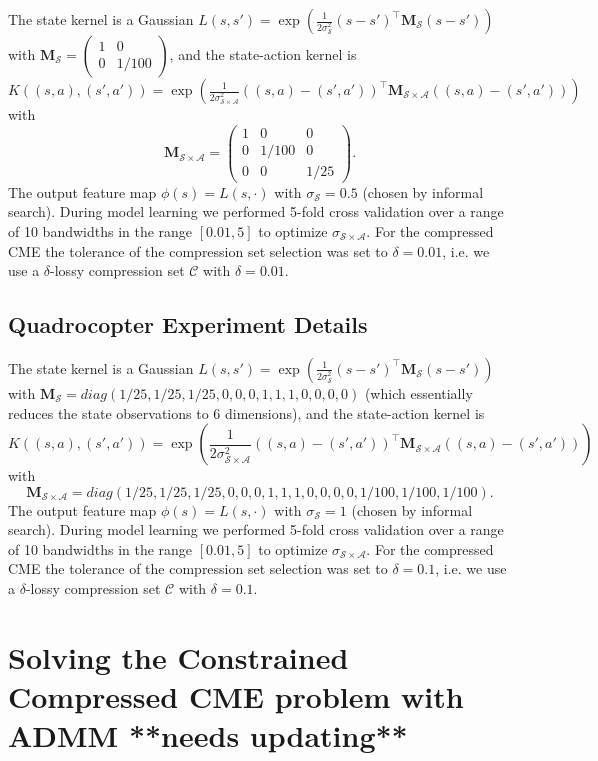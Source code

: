 \documentclass[letterpaper]{article}
\newcommand{\todoc}[2][]{\todo[color=red!20!white,size=\tiny,#1]{#2}}
\newcommand{\cC}{{\mathcal C}}
\newcommand{\cA}{{\mathcal A}}
\newcommand{\cS}{{\mathcal S}}
\newcommand{\bM}{{\bm M}}
\begin{document}
The state kernel is a Gaussian $L(s,s') = \exp\left({\frac{1}{2\sigma_{\cS}^2}(s - s')^\top \bM_\cS (s - s')}\right)$ with $\bM_\cS =\left( \begin{array}{cc}
1 & 0 \\
0 & 1/100  \end{array} \right)$, and the state-action kernel is  $K((s,a),(s',a')) = \exp\left({\frac{1}{2\sigma_{\cS\times\cA}^2}((s,a) - (s',a'))^\top \bM_{\cS\times\cA} ((s,a) - (s',a'))}\right)$ with
$$\bM_{\cS\times\cA} =\left( \begin{array}{ccc}
1 & 0 & 0\\
0 & 1/100 & 0\\
0 & 0 & 1/25\end{array} \right).$$ The output feature map $\phi(s) = L(s,\cdot)$ with $\sigma_{\cS} = 0.5$ (chosen by informal search). During model learning we performed 5-fold cross validation over a range of 10 bandwidths in the range $[0.01,5]$ to optimize $\sigma_{\cS\times\cA}$. For the compressed CME the tolerance of the compression set selection was set to $\delta = 0.01$, i.e. we use a $\delta$-lossy compression set $\cC$ with $\delta=0.01$.

\subsection{Quadrocopter Experiment Details}

The state kernel is a Gaussian $L(s,s') = \exp\left({\frac{1}{2\sigma_{\cS}^2}(s - s')^\top \bM_\cS (s - s')}\right)$ with $\bM_\cS =diag( 1/25 ,1/25 ,1/25, 0, 0, 0 ,1 ,1, 1, 0, 0, 0 ,0)$ (which essentially reduces the state observations to 6 dimensions), and the state-action kernel is $$K((s,a),(s',a')) = \exp\left({\frac{1}{2\sigma_{\cS\times\cA}^2}((s,a) - (s',a'))^\top \bM_{\cS\times\cA} ((s,a) - (s',a'))}\right)$$ with \todoc{Fix long lines}
$$\bM_{\cS\times\cA} =diag( 1/25 ,1/25 ,1/25, 0, 0, 0 ,1 ,1, 1, 0, 0, 0 ,0,1/100,1/100,1/100).$$ The output feature map $\phi(s) = L(s,\cdot)$ with $\sigma_{\cS} = 1$ (chosen by informal search). During model learning we performed 5-fold cross validation over a range of 10 bandwidths in the range $[0.01,5]$ to optimize $\sigma_{\cS\times\cA}$. For the compressed CME the tolerance of the compression set selection was set to $\delta = 0.1$, i.e. we use a $\delta$-lossy compression set $\cC$ with $\delta=0.1$.




\iffalse


\section{Solving the Constrained Compressed CME problem with ADMM **needs updating**}\label{ConstCompSol}
\end{document}

